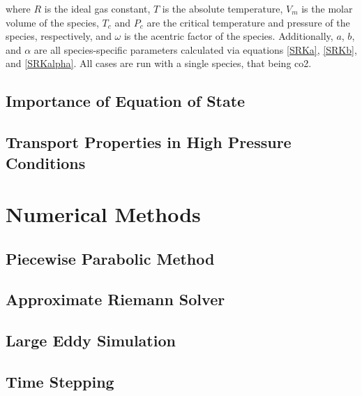 where $R$ is the ideal gas constant, $T$ is the absolute temperature, $V_m$ is the molar volume of the species, $T_c$ and $P_c$ are the critical temperature and pressure of the species, respectively, and $\omega$ is the acentric factor of the species. Additionally, $a$, $b$, and $\alpha$ are all species-specific parameters calculated via equations \ref{SRKa}, \ref{SRKb}, and \ref{SRKalpha}. All cases are run with a single species, that being \gls{co2}.

\subsection{Importance of Equation of State}
\subsection{Transport Properties in High Pressure Conditions}

\section{Numerical Methods}
\subsection{Piecewise Parabolic Method}
\subsection{Approximate Riemann Solver}
\subsection{Large Eddy Simulation}
\subsection{Time Stepping}

